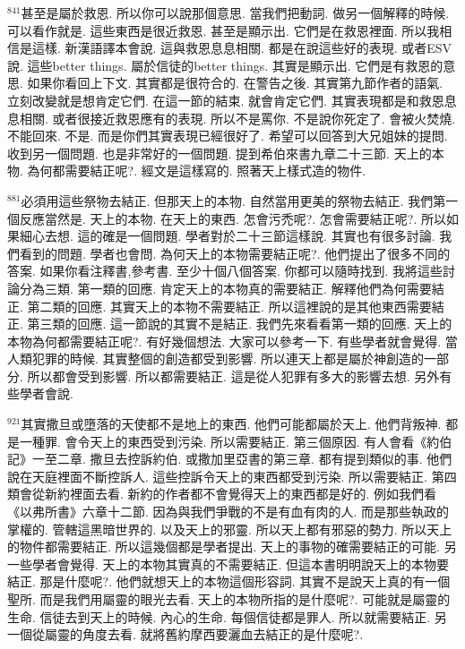 \documentclass{book}
\begin{document}
$^{841}$甚至是屬於救恩.
所以你可以說那個意思.
當我們把動詞.
做另一個解釋的時候.
可以看作就是.
這些東西是很近救恩.
甚至是顯示出.
它們是在救恩裡面.
所以我相信是這樣.
新漢語譯本會說.
這與救恩息息相關.
都是在說這些好的表現.
或者ESV說.
這些better things.
屬於信徒的better things.
其實是顯示出.
它們是有救恩的意思.
如果你看回上下文.
其實都是很符合的.
在警告之後.
其實第九節作者的語氣.
立刻改變就是想肯定它們.
在這一節的結束.
就會肯定它們.
其實表現都是和救恩息息相關.
或者很接近救恩應有的表現.
所以不是罵你.
不是說你死定了.
會被火焚燒.
不能回來.
不是.
而是你們其實表現已經很好了.
希望可以回答到大兄姐妹的提問.
收到另一個問題.
也是非常好的一個問題.
提到希伯來書九章二十三節.
天上的本物.
為何都需要結正呢?.
經文是這樣寫的.
照著天上樣式造的物件.

$^{881}$必須用這些祭物去結正.
但那天上的本物.
自然當用更美的祭物去結正.
我們第一個反應當然是.
天上的本物.
在天上的東西.
怎會污禿呢?.
怎會需要結正呢?.
所以如果細心去想.
這的確是一個問題.
學者對於二十三節這樣說.
其實也有很多討論.
我們看到的問題.
學者也會問.
為何天上的本物需要結正呢?.
他們提出了很多不同的答案.
如果你看注釋書,參考書.
至少十個八個答案.
你都可以隨時找到.
我將這些討論分為三類.
第一類的回應.
肯定天上的本物真的需要結正.
解釋他們為何需要結正.
第二類的回應.
其實天上的本物不需要結正.
所以這裡說的是其他東西需要結正.
第三類的回應.
這一節說的其實不是結正.
我們先來看看第一類的回應.
天上的本物為何都需要結正呢?.
有好幾個想法.
大家可以參考一下.
有些學者就會覺得.
當人類犯罪的時候.
其實整個的創造都受到影響.
所以連天上都是屬於神創造的一部分.
所以都會受到影響.
所以都需要結正.
這是從人犯罪有多大的影響去想.
另外有些學者會說.

$^{921}$其實撒旦或墮落的天使都不是地上的東西.
他們可能都屬於天上.
他們背叛神.
都是一種罪.
會令天上的東西受到污染.
所以需要結正.
第三個原因.
有人會看《約伯記》一至二章.
撒旦去控訴約伯.
或撒加里亞書的第三章.
都有提到類似的事.
他們說在天庭裡面不斷控訴人.
這些控訴令天上的東西都受到污染.
所以需要結正.
第四類會從新約裡面去看.
新約的作者都不會覺得天上的東西都是好的.
例如我們看《以弗所書》六章十二節.
因為與我們爭戰的不是有血有肉的人.
而是那些執政的掌權的.
管轄這黑暗世界的.
以及天上的邪靈.
所以天上都有邪惡的勢力.
所以天上的物件都需要結正.
所以這幾個都是學者提出.
天上的事物的確需要結正的可能.
另一些學者會覺得.
天上的本物其實真的不需要結正.
但這本書明明說天上的本物要結正.
那是什麼呢?.
他們就想天上的本物這個形容詞.
其實不是說天上真的有一個聖所.
而是我們用屬靈的眼光去看.
天上的本物所指的是什麼呢?.
可能就是屬靈的生命.
信徒去到天上的時候.
內心的生命.
每個信徒都是罪人.
所以就需要結正.
另一個從屬靈的角度去看.
就將舊約摩西要灑血去結正的是什麼呢?.
\end{document}
